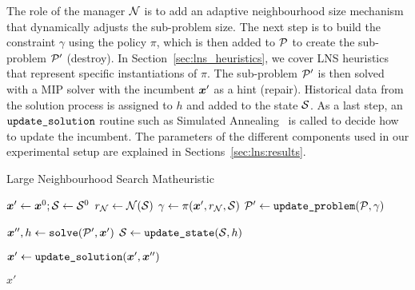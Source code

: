 \documentclass[3p, authoryear, times]{elsarticle}
\begin{document}
The role of the manager $\nsm$ is to add an adaptive neighbourhood size mechanism that dynamically adjusts the sub-problem size. The next step is to build the constraint $\gamma$ using the policy $\pi$, which is then added to $\P$ to create the sub-problem $\P'$ (destroy). In Section~\ref{sec:lns_heuristics}, we cover LNS heuristics that represent specific instantiations of $\pi$.  The sub-problem $\P'$ is then solved with a MIP solver with the incumbent $\xb'$ as a hint (repair). Historical data from the solution process is assigned to $h$ and added to the state $\state$.  As a last step, an $\varname{update_solution}$ routine such as Simulated Annealing~\citep{kirkpatrick_optimization_1983} is called to decide how to update the incumbent. The parameters of the different components used in our experimental setup are explained in Sections~\ref{sec:lns:results}. 

\begin{algorithm}[H]
    \caption{Large Neighbourhood Search Matheuristic}\label{alg:lns}
    \begin{algorithmic}[1]

    \State $\xb' \gets \xb^0; \state \gets \state^0$
        \State $\fixingratio \gets \nsm(\state)$ 
        \State $\gamma \gets \pi(\xb', \fixingratio, \state)$ 
        \State $ \P' \gets \varname{update_problem}(\P, \gamma)$ 

        \State $\xb'', \history \gets \varname{solve}(\P', \xb')$ 
        \State $\state \gets \varname{update_state}(\state, \history )$%

        \State $\xb' \gets \varname{update_solution}(\xb', \xb'')$ %
    
    \EndWhile
    \State \Return $x'$
    \EndProcedure
    \end{algorithmic} 
\end{algorithm} 
\end{document}
